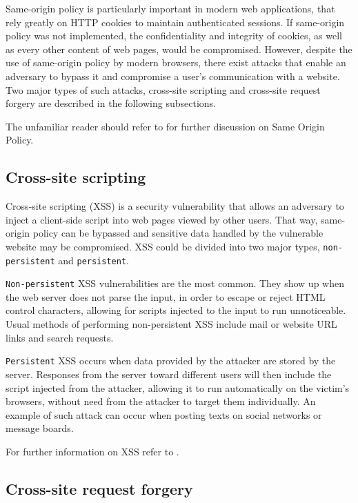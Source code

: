Same-origin policy is particularly important in modern web applications, that
rely greatly on HTTP cookies to maintain authenticated sessions. If same-origin
policy was not implemented, the confidentiality and integrity of cookies, as
well as every other content of web pages, would be compromised. However,
despite the use of same-origin policy by modern browsers, there exist attacks
that enable an adversary to bypass it and compromise a user's communication with
a website. Two major types of such attacks, cross-site scripting and cross-site
request forgery are described in the following subsections.

The unfamiliar reader should refer to \cite{sameoriginpolicymdn} for further
discussion on Same Origin Policy.

\subsection{Cross-site scripting}

Cross-site scripting (XSS) is a security vulnerability that allows an adversary
to inject a client-side script into web pages viewed by other users. That way,
same-origin policy can be bypassed and sensitive data handled by the vulnerable
website may be compromised. XSS could be divided into two major types,
\texttt{non-persistent} and \texttt{persistent}.

\texttt{Non-persistent} XSS vulnerabilities are the most common. They show up
when the web server does not parse the input, in order to escape or reject HTML
control characters, allowing for scripts injected to the input to run
unnoticeable. Usual methods of performing non-persistent XSS include mail or
website URL links and search requests.

\texttt{Persistent} XSS occurs when data provided by the attacker are stored by
the server. Responses from the server toward different users will then include
the script injected from the attacker, allowing it to run automatically on the
victim's browsers, without need from the attacker to target them individually.
An example of such attack can occur when posting texts on social networks or
message boards.

For further information on XSS refer to \cite{xssowasp}.

\subsection{Cross-site request forgery}

